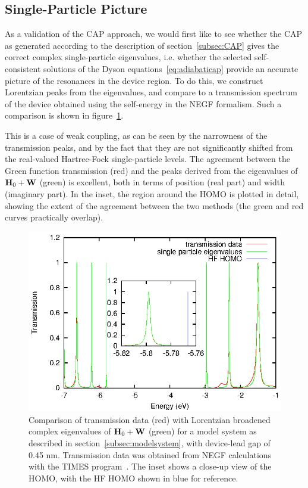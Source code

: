 \subsection{Single-Particle Picture}
\label{subsec:SingleParticle}

As a validation of the \ac{CAP} approach, we would first like to see whether
the \ac{CAP} as generated according to the description of
section~\ref{subsec:CAP} gives the correct complex single-particle eigenvalues,
i.e. whether the selected self-consistent solutions of the Dyson
equations~\ref{eq:adiabaticap} provide an accurate picture of the resonances
in the device region. To do this, we construct Lorentzian peaks from the
eigenvalues, and compare to a transmission spectrum of the device obtained
using the self-energy in the \ac{NEGF} formalism. Such a comparison is shown in
figure~\ref{fig:13evals}.

This is a case of weak coupling, as can be seen by the narrowness of the
transmission peaks, and by the fact that they are not significantly shifted
from the real-valued Hartree-Fock single-particle levels. The agreement between
the Green function transmission (red) and the peaks derived from the
eigenvalues of $\mathbf{H}_0 + \mathbf{W}$ (green) is excellent, both in terms of
position (real part) and width (imaginary part). In the inset, the region
around the \ac{HOMO} is plotted in detail, showing the extent of the agreement
between the two methods (the green and red curves practically overlap).

\begin{figure} 
	\begin{center}
		\includegraphics[width=0.9\linewidth]{figures/13evals}
	\end{center}
	\caption{Comparison of transmission data (red) with Lorentzian
	broadened complex eigenvalues of $\mathbf{H}_0 + \mathbf{W}$ (green) for a
	model system as described in section~\ref{subsec:modelsystem}, with
	device-lead gap of 0.45 nm. Transmission data was obtained from
	\ac{NEGF} calculations with the TIMES program~\cite{times}.
	The inset shows a close-up view of the \ac{HOMO}, with the HF \ac{HOMO}
	shown in blue for reference.
	}
	\label{fig:13evals}
\end{figure}

